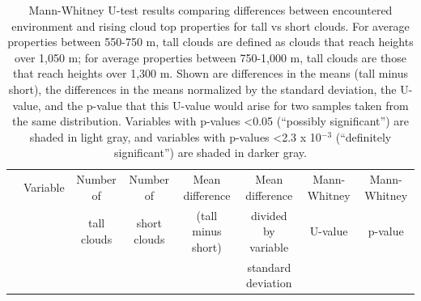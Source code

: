 \documentclass[acp]{copernicus}
\begin{document}




\begin{table}[t]
\label{tbl:mannwhitneyu}
\caption{Mann-Whitney U-test results comparing differences between 
encountered environment and rising cloud top properties for tall vs short 
clouds.  For average properties between 550-750 m, tall clouds are defined as 
clouds that reach heights over 1,050 m; for average properties between 
750-1,000 m, tall clouds are those that reach heights over 1,300 m.  Shown are 
differences in the means (tall minus short), the differences in the means 
normalized by the standard deviation, the U-value, and the p-value that this 
U-value would arise for two samples taken from the same distribution. Variables 
with p-values \textless 0.05 (``possibly significant'') are shaded in light 
gray, and variables with p-values \textless 2.3 x 10$^{-3}$ (``definitely 
significant'') are shaded in darker gray.}
\vskip4mm
\centering
\begin{tabular}{lccccccc}
\tophline
& Variable & Number of & Number of & Mean difference & Mean difference  & Mann-Whitney & Mann-Whitney \\
& & tall clouds & short clouds & (tall minus short) & divided by variable  & U-value & p-value \\
& & & & & standard deviation & & \\


\end{tabular}
\end{table}
\end{document}
